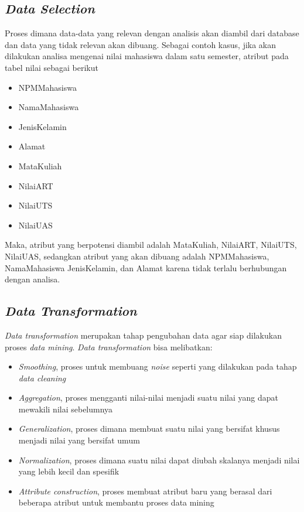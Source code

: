 \subsection{\textsl{Data Selection}}
Proses dimana data-data yang relevan dengan analisis akan diambil dari database dan data yang tidak relevan akan dibuang. Sebagai contoh kasus, jika akan dilakukan analisa mengenai nilai mahasiswa dalam satu semester, atribut pada tabel nilai sebagai berikut
	\begin{itemize}
		\item NPMMahasiswa
		\item NamaMahasiswa
		\item JenisKelamin
		\item Alamat
		\item MataKuliah
		\item NilaiART
		\item NilaiUTS
		\item NilaiUAS
	\end{itemize}
Maka, atribut yang berpotensi diambil adalah MataKuliah, NilaiART, NilaiUTS, NilaiUAS, sedangkan atribut yang akan dibuang adalah NPMMahasiswa, NamaMahasiswa JenisKelamin, dan Alamat karena tidak terlalu berhubungan dengan analisa.

\subsection{\textsl{Data Transformation}}
\textsl{Data transformation} merupakan tahap pengubahan data agar siap dilakukan proses \textsl{data mining}. \textsl{Data transformation} bisa melibatkan:
	\begin{itemize}
		\item \textsl{Smoothing}, proses untuk membuang \textsl{noise} seperti yang dilakukan pada tahap \textsl{data cleaning}
		\item \textsl{Aggregation}, proses mengganti nilai-nilai menjadi suatu nilai yang dapat mewakili nilai sebelumnya
		\item \textsl{Generalization}, proses dimana membuat suatu nilai yang bersifat khusus menjadi nilai yang bersifat umum
		\item \textsl{Normalization}, proses dimana suatu nilai dapat diubah skalanya menjadi nilai yang lebih kecil dan spesifik
		\item \textsl{Attribute construction}, proses membuat atribut baru yang berasal dari beberapa atribut untuk membantu proses data mining
	\end{itemize}
	

